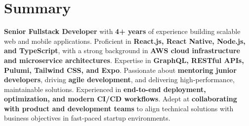 \section*{Summary}
\textbf{Senior Fullstack Developer} with \textbf{4+ years} of experience building scalable web and mobile applications. Proficient in \textbf{React.js, React Native, Node.js, and TypeScript}, with a strong background in \textbf{AWS cloud infrastructure and microservice architectures}. Expertise in \textbf{GraphQL, RESTful APIs, Pulumi, Tailwind CSS, and Expo}. Passionate about \textbf{mentoring junior developers}, driving \textbf{agile development}, and delivering high-performance, maintainable solutions. Experienced in \textbf{end-to-end deployment, optimization, and modern CI/CD workflows}. Adept at \textbf{collaborating with product and development teams} to align technical solutions with business objectives in fast-paced startup environments.
